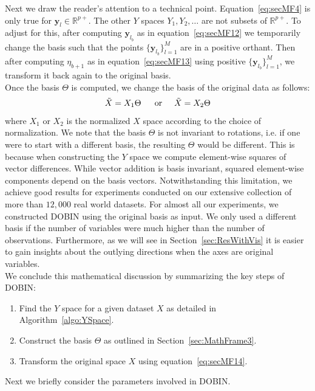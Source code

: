\documentclass[a4paper,11pt]{article}
\begin{document}
Next we draw the reader's attention to a technical point. Equation~\eqref{eq:secMF4} is only true for  $\bm{y}_l \in \mathbb{R}^{p+}$. The other $Y$ spaces $Y_1, Y_2, \ldots $ are not  subsets of $\mathbb{R}^{p+}$. To adjust for this, after computing  $\bm{y}_{l_{b}}$ as in equation~\eqref{eq:secMF12} we temporarily change the basis such that the points  $\{ \bm{y}_{l_{b}}\}_{l=1}^M$ are in a positive orthant.  Then after computing  $\eta_{b+1}$ as in equation~\eqref{eq:secMF13} using positive $\{ \bm{y}_{l_{b}}\}_{l=1}^M$,  we transform it back again to the original basis.  \\

\noindent
Once the basis $\Theta$  is computed, we  change the basis of the original data as follows:
\begin{equation}\label{eq:secMF14}
    \tilde{X} = X_1 \Theta \,  \hspace{0.5cm}  \text{or}  \hspace{0.5cm}   \tilde{X} = X_2 \Theta
\end{equation}
where $X_1$ or $X_2$ is the normalized $X$ space according to the choice of normalization. We note that the basis $\Theta$ is not invariant to rotations, i.e. if one were to start with a different basis, the resulting $\Theta$ would be different. This is because when constructing the $Y$ space we compute element-wise squares of vector differences. While vector addition is basis invariant, squared element-wise components depend on the basis vectors. Notwithstanding this limitation, we achieve good results for experiments conducted on our extensive collection of more than $12,000$ real world datasets. For almost all our experiments, we constructed DOBIN using the original basis as input. We only used a different basis if the number of variables  were much higher than the number of observations.  %
Furthermore, as we will see in Section~\ref{sec:ResWithVis} it is easier to gain insights about the outlying directions when the axes are original variables. \\

\noindent
We conclude this mathematical discussion by summarizing the key steps of DOBIN:
\begin{enumerate}
    \item Find the $Y$ space for a given dataset $X$ as detailed in Algorithm~\ref{algo:YSpace}.
    \item Construct the basis $\Theta$ as outlined in Section~\ref{sec:MathFrame3}. 
    \item Transform the original space $X$ using equation~\eqref{eq:secMF14}.
\end{enumerate}
Next we briefly consider the parameters involved in DOBIN. 
\end{document}
